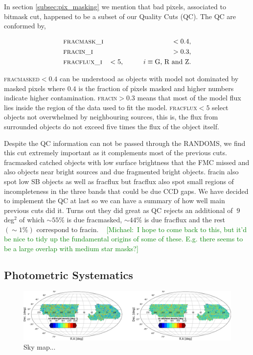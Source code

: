 \documentclass[fleqn,usenatbib]{mnras}
\newcommand{\mike}[1]{~\newline\noindent \textcolor{Green}{{ [Michael:~{#1}]\\}}}
\newcommand{\FRACMASK}{{\textsc{fracmasked}}\xspace}
\newcommand{\FRACFLUX}{{\textsc{fracflux}}\xspace}
\newcommand{\FRACIN}{{\textsc{fracin}}\xspace}
\begin{document}
In section \ref{subsec:pix_masking} we mention that bad pixels, associated to bitmask cut, happened to be a subset of our Quality Cuts (QC). The QC are conformed by,

\begin{eqnarray}
    &\textsc{fracmask\_i}& < 0.4, \nonumber \\
    &\textsc{fracin\_i}& > 0.3, \nonumber \\
    &\textsc{fracflux\_i}& < 5, \hspace{1cm} i \equiv  \textrm{G, R and Z.}
\end{eqnarray}

\FRACMASK $< 0.4$ can be understood as objects with model not dominated by masked pixels where $0.4$ is the fraction of pixels masked and higher numbers indicate higher contamination. \FRACIN $> 0.3$ means that most of the model flux lies inside the region of the data used to fit the model. \FRACFLUX $< 5$ select objects not overwhelmed by neighbouring sources, this is, the flux from surrounded objects do not exceed five times the flux of the object itself.

Despite the QC information can not be passed through the RANDOMS, we find this cut extremely important as it complements most of the previous cuts. fracmasked catched objects with low surface brightness that the FMC missed and also objects near bright sources and due fragmented bright objects. fracin also spot low SB objects as well as fracflux but fracflux also spot small regions of incompleteness in the three bands that could be due CCD gaps. We have decided to implement the QC at last so we can have a summary of how well main previous cuts did it. Turns out they did great as QC rejects an additional of $~9$ deg$^{2}$ of which $\sim 55 \%$ is due fracmasked, $\sim 44 \%$ is due fracflux and the rest $(\sim 1 \%)$ correspond to fracin.
\mike{I hope to come back to this, but it'd be nice to tidy up the fundamental origins of some of these.  E.g. there seems to be a large overlap with medium star masks?}

\subsection{Photometric Systematics}

\begin{figure}
	\includegraphics[width=17cm]{images/skymaps_bright_faint.png}
    \caption{Sky map...}
    \label{fig:skymap_densities}
\end{figure}
\end{document}
